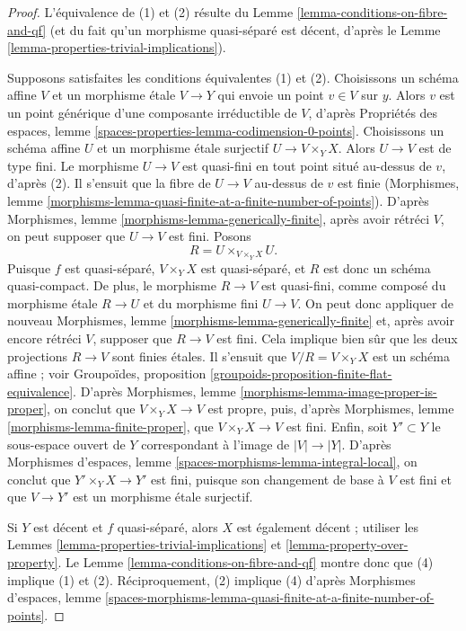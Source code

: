 \begin{proof}
L'équivalence de (1) et (2) résulte du
Lemme \ref{lemma-conditions-on-fibre-and-qf}
(et du fait qu'un morphisme quasi-séparé est décent, d'après le
Lemme \ref{lemma-properties-trivial-implications}).

\medskip\noindent
Supposons satisfaites les conditions équivalentes (1) et (2). Choisissons un
schéma affine $V$ et un morphisme étale $V \to Y$ qui envoie un point
$v \in V$ sur $y$. Alors $v$ est un point générique d'une composante
irréductible de $V$, d'après Propriétés des espaces, lemme
\ref{spaces-properties-lemma-codimension-0-points}.
Choisissons un schéma affine $U$ et un morphisme étale surjectif
$U \to V \times_Y X$. Alors $U \to V$ est de type fini.
Le morphisme $U \to V$ est quasi-fini en tout point situé au-dessus de $v$,
d'après (2). Il s'ensuit que la fibre de $U \to V$ au-dessus de $v$ est finie
(Morphismes, lemme
\ref{morphisms-lemma-quasi-finite-at-a-finite-number-of-points}). D'après
Morphismes, lemme \ref{morphisms-lemma-generically-finite},
après avoir rétréci $V$, on peut supposer que $U \to V$ est fini.
Posons
$$
R = U \times_{V \times_Y X} U.
$$
Puisque $f$ est quasi-séparé, $V \times_Y X$ est quasi-séparé, et $R$ est
donc un schéma quasi-compact. De plus, le morphisme $R \to V$ est quasi-fini,
comme composé du morphisme étale $R \to U$ et du morphisme fini $U \to V$.
On peut donc appliquer de nouveau Morphismes, lemme
\ref{morphisms-lemma-generically-finite} et, après avoir encore rétréci $V$,
supposer que $R \to V$ est fini. Cela implique bien sûr que les deux
projections $R \to V$ sont finies étales. Il s'ensuit que
$V/R = V \times_Y X$ est un schéma affine ; voir Groupoïdes, proposition
\ref{groupoids-proposition-finite-flat-equivalence}.
D'après Morphismes, lemme \ref{morphisms-lemma-image-proper-is-proper},
on conclut que $V \times_Y X \to V$ est propre, puis, d'après
Morphismes, lemme \ref{morphisms-lemma-finite-proper},
que $V \times_Y X \to V$ est fini. Enfin, soit $Y' \subset Y$ le
sous-espace ouvert de $Y$
correspondant à l'image de $|V| \to |Y|$.
D'après Morphismes d'espaces, lemme
\ref{spaces-morphisms-lemma-integral-local}, on conclut que
$Y' \times_Y X \to Y'$ est fini, puisque son changement de base à $V$ est
fini et que $V \to Y'$ est un morphisme étale surjectif.

\medskip\noindent
Si $Y$ est décent et $f$ quasi-séparé, alors $X$ est également décent ;
utiliser les Lemmes \ref{lemma-properties-trivial-implications} et
\ref{lemma-property-over-property}.
Le Lemme \ref{lemma-conditions-on-fibre-and-qf} montre donc que (4) implique
(1) et (2). Réciproquement, (2) implique (4) d'après Morphismes d'espaces,
lemme \ref{spaces-morphisms-lemma-quasi-finite-at-a-finite-number-of-points}.
\end{proof}

